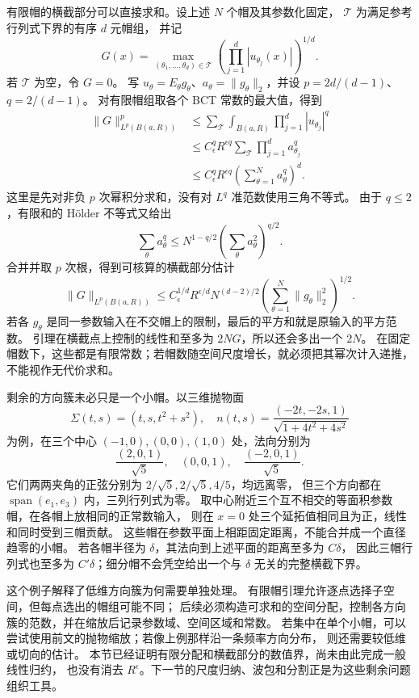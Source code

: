 \ProseParagraphBreak
有限帽的横截部分可以直接求和。设上述 \(N\) 个帽及其参数化固定，
\(\mathcal T\) 为满足参考行列式下界的有序 \(d\) 元帽组，
并记
\[
 G(x)=\max_{(\theta_1,\ldots,\theta_d)\in\mathcal T}
 \left(\prod_{j=1}^d|u_{\theta_j}(x)|\right)^{1/d}.
\]
若 \(\mathcal T\) 为空，令 \(G=0\)。
写 \(u_\theta=E_\theta g_\theta\)、\(a_\theta=\|g_\theta\|_2\)，并设
\(p=2d/(d-1)\)、\(q=2/(d-1)\)。
对有限帽组取各个 BCT 常数的最大值，得到
\[
 \begin{split}
 \|G\|_{L^p(B(a,R))}^p
 &\leq\sum_{\mathcal T}\int_{B(a,R)}
 \prod_{j=1}^d|u_{\theta_j}|^q\\
 &\leq C_\epsilon^qR^{\epsilon q}
 \sum_{\mathcal T}\prod_{j=1}^da_{\theta_j}^q\\
 &\leq C_\epsilon^qR^{\epsilon q}
 \left(\sum_{\theta=1}^Na_\theta^q\right)^d.
 \end{split}
\]
这里是先对非负 \(p\) 次幂积分求和，没有对 \(L^q\) 准范数使用三角不等式。
由于 \(q\leq2\)，有限和的 Hölder 不等式又给出
\[
 \sum_\theta a_\theta^q
 \leq N^{1-q/2}
 \left(\sum_\theta a_\theta^2\right)^{q/2}.
\]
合并并取 \(p\) 次根，得到可核算的横截部分估计
\begin{equation}\label{b2:eq:25-cap-broad-bound}
 \|G\|_{L^p(B(a,R))}
 \leq C_\epsilon^{1/d}R^{\epsilon/d}
 N^{(d-2)/2}
 \left(\sum_{\theta=1}^N\|g_\theta\|_2^2\right)^{1/2}.
\end{equation}
若各 \(g_\theta\) 是同一参数输入在不交帽上的限制，最后的平方和就是原输入的平方范数。
引理在横截点上控制的线性和至多为 \(2NG\)，所以还会多出一个 \(2N\)。
在固定帽数下，这些都是有限常数；若帽数随空间尺度增长，就必须把其幂次计入递推，不能视作无代价求和。

\ProseParagraphBreak
剩余的方向簇未必只是一个小帽。以三维抛物面
\[
 \Sigma(t,s)=(t,s,t^2+s^2),\quad
 n(t,s)=\frac{(-2t,-2s,1)}{\sqrt{1+4t^2+4s^2}}
\]
为例，在三个中心 \((-1,0),(0,0),(1,0)\) 处，法向分别为
\[
 \frac{(2,0,1)}{\sqrt5},\quad (0,0,1),\quad
 \frac{(-2,0,1)}{\sqrt5}.
\]
它们两两夹角的正弦分别为 \(2/\sqrt5,2/\sqrt5,4/5\)，均远离零，
但三个方向都在 \(\operatorname{span}(e_1,e_3)\) 内，三列行列式为零。
取中心附近三个互不相交的等面积参数帽，在各帽上放相同的正常数输入，
则在 \(x=0\) 处三个延拓值相同且为正，线性和同时受到三帽贡献。
这些帽在参数平面上相距固定距离，不能合并成一个直径趋零的小帽。
若各帽半径为 \(\delta\)，其法向到上述平面的距离至多为 \(C\delta\)，
因此三帽行列式也至多为 \(C'\delta\)；细分帽不会凭空给出一个与 \(\delta\) 无关的完整横截下界。

这个例子解释了低维方向簇为何需要单独处理。
有限帽引理允许逐点选择子空间，但每点选出的帽组可能不同；
后续必须构造可求和的空间分配，控制各方向簇的范数，并在缩放后记录参数域、空间区域和常数。
若集中在单个小帽，可以尝试使用前文的抛物缩放；若像上例那样沿一条频率方向分布，
则还需要较低维或切向的估计。
本节已经证明有限分配和横截部分的数值界，尚未由此完成一般线性归约，
也没有消去 \(R^\epsilon\)。下一节的尺度归纳、波包和分割正是为这些剩余问题组织工具。
